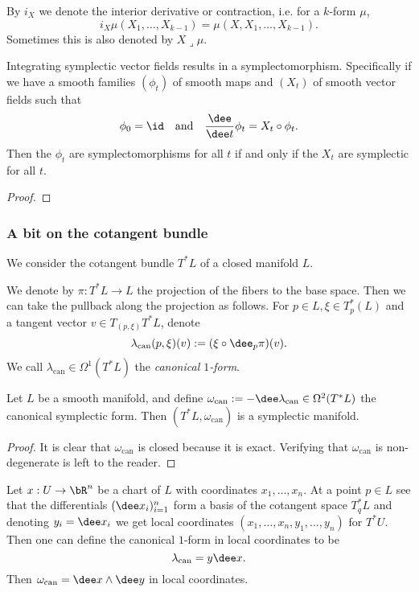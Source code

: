 \begin{remark}
    By $i_X$ we denote the interior derivative or contraction, i.e. for a $k$-form $\mu$,
    \[i_X\mu(X_1,\ldots,X_{k-1})=\mu(X,X_1,\ldots,X_{k-1}).\]
    Sometimes this is also denoted by $X\lrcorner \mu$.
\end{remark}

\begin{prop}
    Integrating symplectic vector fields results in a symplectomorphism.
    Specifically if we have a smooth families $(\phi_t)$ of smooth maps and $(X_t)$ of smooth vector fields such that
    \[\phi_0=\id\quad\text{and}\quad\frac{\dee}{\dee t}\phi_t=X_t\circ\phi_t.\]
    Then the $\phi_t$ are symplectomorphisms for all $t$ if and only if the 
    $X_t$ are symplectic for all $t$.
\end{prop}

\begin{proof}
\end{proof}

\subsubsection*{A bit on the cotangent bundle}
We consider the cotangent bundle $T^*L$ of a closed manifold $L$.
\begin{dfn}
    We denote by $\pi:T^*L\to L$ the projection of the fibers to the base space.
    Then we can take the pullback along the projection as follows.
    For $p\in L,\xi\in T^*_p(L)$ and a tangent vector $v\in T_{(p,\xi)}T^*L$, denote
    \[\lambda_{\mathrm{can}}(p,\xi)(v):=(\xi\circ\dee_p\pi)(v).\]
    We call $\lambda_{\mathrm{can}}\in\Omega^1(T^*L)$ the \emph{canonical $1$-form}.
\end{dfn}

\begin{prop}
    Let $L$ be a smooth manifold, and define $\omega_{\mathrm{can}}:=-\dee\lambda_{\mathrm{can}}\in\Omega^2(T^*L)$ the canonical symplectic form.
    Then $(T^*L,\omega_{\mathrm{can}})$ is a symplectic manifold.
\end{prop}

\begin{proof}
    It is clear that $\omega_{\mathrm{can}}$ is closed because it is exact.
    Verifying that $\omega_{\mathrm{can}}$ is non-degenerate is left to the reader.
\end{proof}

\begin{remark}
    Let $x:U\to\bR^n$ be a chart of $L$ with coordinates $x_1,\ldots,x_n$.
    At a point $p\in L$ see that the differentials $(\dee x_i)_{i=1}^n$ form a basis of the cotangent space $T_q^*L$ and denoting $y_i=\dee x_i$ we get local coordinates $(x_1,\ldots,x_n,y_1,\ldots,y_n)$ for $T^*U$.
    Then one can define the canonical $1$-form in local coordinates to be
    \[\lambda_{\mathrm{can}}=y\dee x.\]
    Then $\omega_{\mathrm{can}}=\dee x\wedge\dee y$ in local coordinates.
\end{remark}

